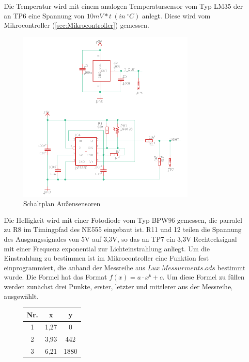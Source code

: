 \documentclass[12pt, a4paper, oneside]{report}
\begin{document}
Die Temperatur wird mit einem analogen Temperatursensor vom Typ LM35 \cite{ds:temp} der an TP6 eine Spannung von
$ 10mV * t~(in~^\circ C)$ anlegt. Diese wird vom Mikrocontroller (\autoref{sec:Mikrocontroller}) gemessen.

\begin{figure}[h]
	\centering
	\includegraphics[width=0.8\textwidth]{pic/OutsideSensors}
	\caption{Schaltplan Außensensoren}
	\label{fig:Außensensor}
\end{figure}

Die Helligkeit wird mit einer Fotodiode vom Typ BPW96 \cite{ds:light} gemessen, die parralel zu R8 im Timingpfad des NE555 eingebaut ist. R11 und 12 teilen die Spannung des Ausgangssignales von 5V auf 3,3V, so das an TP7 ein 3,3V Rechtecksignal mit einer Frequenz exponential zur Lichteinstrahlung anliegt. Um die Einstrahlung zu bestimmen ist im Mikrocontroller eine Funktion fest einprogrammiert, die anhand der Messreihe aus $Lux~Messurments.ods$ bestimmt wurde. Die Formel hat das Format $f(x)=a \cdot x^b + c$. Um diese Formel zu füllen werden zunächst drei Punkte, erster, letzter und mittlerer aus der Messreihe, ausgewählt.

\begin{figure}[h]
\centering
\begin{tabular}{c|c|c}
	Nr. & x & y\\
	\hline
	1 & 1,27 & 0\\
	2 & 3,93 & 442\\
	3 & 6,21 & 1880\\
\end{tabular}
\end{figure}
\end{document}
